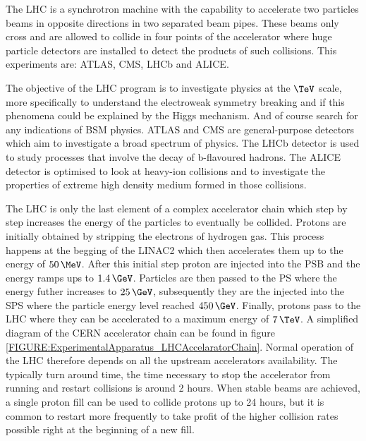 The \gls{LHC} is a synchrotron machine with the capability to accelerate two particles beams in opposite directions in two separated beam pipes. These beams only cross and are allowed to collide in four points of the accelerator where huge particle detectors are installed to detect the products of such collisions. This experiments are: \gls{ATLAS}\cite{ARTICLE:TheATLASExperiment}, \gls{CMS}\cite{ARTICLE:TheCMSExperiment}, \gls{LHCb}\cite{ARTICLE:TheLHCbExperiment} and \gls{ALICE}\cite{ARTICLE:TheALICEExperiment}.

The objective of the \gls{LHC} program is to investigate physics at the $\TeV$ scale, more specifically to understand the electroweak symmetry breaking and if this phenomena could be explained by the Higgs mechanism. And of course search for any indications of \gls{BSM} physics. \gls{ATLAS} and \gls{CMS} are general-purpose detectors which aim to investigate a broad spectrum of physics. The \gls{LHCb} detector is used to study processes that involve the decay of b-flavoured hadrons. The \gls{ALICE} detector is optimised to look at heavy-ion collisions and to investigate the properties of extreme high density medium formed in those collisions.

The \gls{LHC} is only the last element of a complex accelerator chain which step by step increases the energy of the particles to eventually be collided. Protons are initially obtained by stripping the electrons of hydrogen gas. This process happens at the begging of the \gls{LINAC2} which then accelerates them up to the energy of $50\,\MeV$. After this initial step proton are injected into the \gls{PSB} and the energy ramps ups to $1.4\,\GeV$. Particles are then passed to the \gls{PS} where the energy futher increases to $25\,\GeV$, subsequently they are the injected into the \gls{SPS} where the particle energy level reached $450\,\GeV$. Finally, protons pass to the \gls{LHC} where they can be accelerated to a maximum energy of $7\,\TeV$. A simplified diagram of the \gls{CERN} accelerator chain can be found in figure \ref{FIGURE:ExperimentalApparatus_LHCAccelaratorChain}. 
Normal operation of the \gls{LHC} therefore depends on all the upstream accelerators availability. The typically turn around time, the time necessary to stop the accelerator from running and restart collisions is around 2 hours. When stable beams are achieved, a single proton fill can be used to collide protons up to 24 hours, but it is common to restart more frequently to take profit of the higher collision rates possible right at the beginning of a new fill.

